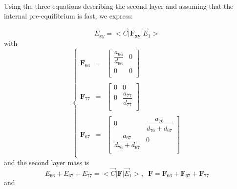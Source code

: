 \documentclass[aps,onecolumn,11pt]{revtex4}
\newcommand{\mymat}[1]{{\bm{#1}}}
\begin{document}
\begin{itemize}
\end{itemize}

Using the three equations describing the second layer and assuming that the internal pre-equilibrium is fast, we express:

\begin{equation}
\boxed{
E_{xy} = <{\vec{C}} \vert \mymat{F_{xy}} \vert \vec{E}_1 >
}
\end{equation}
with
\begin{equation}
\left\lbrace
\begin{array}{rcl}
\mymat{F}_{66} & = & 
\begin{bmatrix}
	\dfrac{a_{66}}{d_{66}} & 0 \\
	0 & 0\\
\end{bmatrix} \\
\\
\mymat{F}_{77} & = & 
\begin{bmatrix}
	0 & 0 \\
	0 & \dfrac{a_{77}}{d_{77}}\\
\end{bmatrix}  \\
\\
\mymat{F}_{67} & = & 
\begin{bmatrix}
	0 &\dfrac{a_{76}}{d_{76}+d_{67}}\\
	\dfrac{a_{67}}{d_{76}+d_{67}} & 0\\
\end{bmatrix} \\
\end{array}
\right.
\end{equation}
and the second layer mass is
\begin{equation}
E_{66} + E_{67} + E_{77} = <{\vec{C}} \vert \mymat{F} \vert \vec{E}_1 >, \;\;
 \mymat{F} 
 =  \mymat{F}_{66} + \mymat{F}_{67}  + \mymat{F}_{77} 
\end{equation}
and
\end{document}

